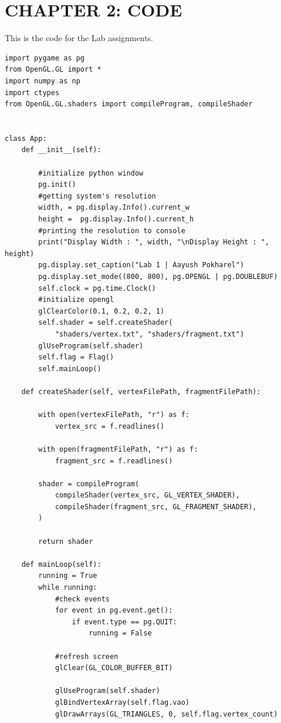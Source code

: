 \documentclass[12pt]{article}
\begin{document}
\section{CHAPTER 2: CODE}
This is the code for the Lab assignments.
\begin{verbatim}
import pygame as pg
from OpenGL.GL import *
import numpy as np
import ctypes
from OpenGL.GL.shaders import compileProgram, compileShader


class App:
    def __init__(self):

        #initialize python window
        pg.init()
        #getting system's resolution
        width, = pg.display.Info().current_w
        height =  pg.display.Info().current_h
        #printing the resolution to console
        print("Display Width : ", width, "\nDisplay Height : ", height)
        pg.display.set_caption("Lab 1 | Aayush Pokharel")
        pg.display.set_mode((800, 800), pg.OPENGL | pg.DOUBLEBUF)
        self.clock = pg.time.Clock()
        #initialize opengl
        glClearColor(0.1, 0.2, 0.2, 1)
        self.shader = self.createShader(
            "shaders/vertex.txt", "shaders/fragment.txt")
        glUseProgram(self.shader)
        self.flag = Flag()
        self.mainLoop()

    def createShader(self, vertexFilePath, fragmentFilePath):

        with open(vertexFilePath, "r") as f:
            vertex_src = f.readlines()

        with open(fragmentFilePath, "r") as f:
            fragment_src = f.readlines()

        shader = compileProgram(
            compileShader(vertex_src, GL_VERTEX_SHADER),
            compileShader(fragment_src, GL_FRAGMENT_SHADER),
        )

        return shader

    def mainLoop(self):
        running = True
        while running:
            #check events
            for event in pg.event.get():
                if event.type == pg.QUIT:
                    running = False

            #refresh screen
            glClear(GL_COLOR_BUFFER_BIT)

            glUseProgram(self.shader)
            glBindVertexArray(self.flag.vao)
            glDrawArrays(GL_TRIANGLES, 0, self.flag.vertex_count)


\end{verbatim}
\end{document}

